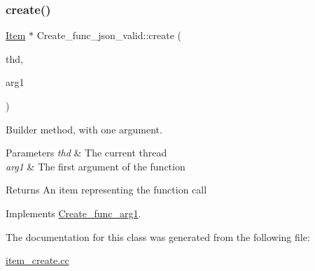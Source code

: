 \subsubsection{\texorpdfstring{create()}{create()}}
{\footnotesize\ttfamily \mbox{\hyperlink{classItem}{Item}} $\ast$ Create\+\_\+func\+\_\+json\+\_\+valid\+::create (\begin{DoxyParamCaption}\item[{T\+HD $\ast$}]{thd,  }\item[{\mbox{\hyperlink{classItem}{Item}} $\ast$}]{arg1 }\end{DoxyParamCaption})\hspace{0.3cm}{\ttfamily [virtual]}}

Builder method, with one argument. 
\begin{DoxyParams}{Parameters}
{\em thd} & The current thread \\
\hline
{\em arg1} & The first argument of the function \\
\hline
\end{DoxyParams}
\begin{DoxyReturn}{Returns}
An item representing the function call 
\end{DoxyReturn}


Implements \mbox{\hyperlink{classCreate__func__arg1_a3e9a98f755cd82c3e762e334c955a8c9}{Create\+\_\+func\+\_\+arg1}}.



The documentation for this class was generated from the following file\+:\begin{DoxyCompactItemize}
\item 
\mbox{\hyperlink{item__create_8cc}{item\+\_\+create.\+cc}}\end{DoxyCompactItemize}
